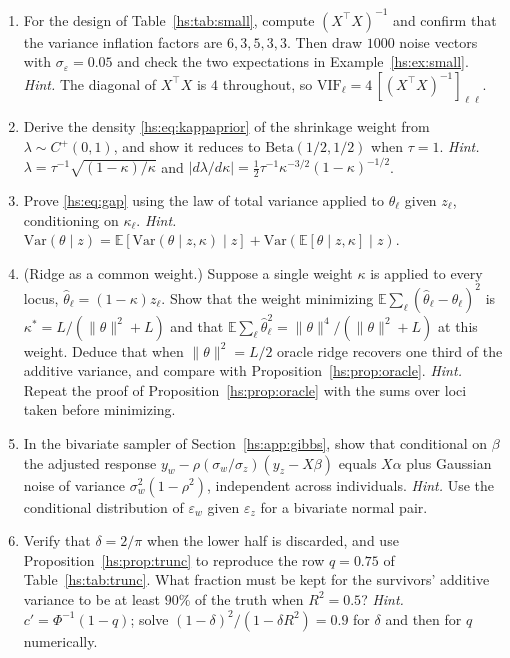 \begin{enumerate}[label=\arabic*.,leftmargin=*,itemsep=4pt]
\item For the design of Table~\ref{hs:tab:small}, compute $(X^\top X)^{-1}$ and confirm that the variance inflation factors are $6, 3, 5, 3, 3$. Then draw $1000$ noise vectors with $\sigma_\varepsilon = 0.05$ and check the two expectations in Example~\ref{hs:ex:small}.
\emph{Hint.} The diagonal of $X^\top X$ is $4$ throughout, so $\mathrm{VIF}_\ell = 4\,[(X^\top X)^{-1}]_{\ell\ell}$.

\item Derive the density \eqref{hs:eq:kappaprior} of the shrinkage weight from $\lambda \sim C^+(0,1)$, and show it reduces to $\mathrm{Beta}(1/2,1/2)$ when $\tau = 1$.
\emph{Hint.} $\lambda = \tau^{-1}\sqrt{(1-\kappa)/\kappa}$ and $|d\lambda/d\kappa| = \tfrac12\tau^{-1}\kappa^{-3/2}(1-\kappa)^{-1/2}$.

\item Prove \eqref{hs:eq:gap} using the law of total variance applied to $\theta_\ell$ given $z_\ell$, conditioning on $\kappa_\ell$.
\emph{Hint.} $\mathrm{Var}(\theta\mid z) = \mathbb{E}[\mathrm{Var}(\theta\mid z,\kappa)\mid z] + \mathrm{Var}(\mathbb{E}[\theta\mid z,\kappa]\mid z)$.

\item (Ridge as a common weight.) Suppose a single weight $\kappa$ is applied to every locus, $\hat\theta_\ell = (1-\kappa)z_\ell$. Show that the weight minimizing $\mathbb{E}\sum_\ell(\hat\theta_\ell - \theta_\ell)^2$ is $\kappa^* = L/(\|\theta\|^2 + L)$ and that $\mathbb{E}\sum_\ell\hat\theta_\ell^2 = \|\theta\|^4/(\|\theta\|^2+L)$ at this weight. Deduce that when $\|\theta\|^2 = L/2$ oracle ridge recovers one third of the additive variance, and compare with Proposition~\ref{hs:prop:oracle}.
\emph{Hint.} Repeat the proof of Proposition~\ref{hs:prop:oracle} with the sums over loci taken before minimizing.

\item In the bivariate sampler of Section~\ref{hs:app:gibbs}, show that conditional on $\beta$ the adjusted response $y_w - \rho(\sigma_w/\sigma_z)(y_z - X\beta)$ equals $X\alpha$ plus Gaussian noise of variance $\sigma_w^2(1-\rho^2)$, independent across individuals.
\emph{Hint.} Use the conditional distribution of $\varepsilon_w$ given $\varepsilon_z$ for a bivariate normal pair.

\item Verify that $\delta = 2/\pi$ when the lower half is discarded, and use Proposition~\ref{hs:prop:trunc} to reproduce the row $q = 0.75$ of Table~\ref{hs:tab:trunc}. What fraction must be kept for the survivors' additive variance to be at least $90\%$ of the truth when $R^2 = 0.5$?
\emph{Hint.} $c' = \Phi^{-1}(1-q)$; solve $(1-\delta)^2/(1-\delta R^2) = 0.9$ for $\delta$ and then for $q$ numerically.


\end{enumerate}
